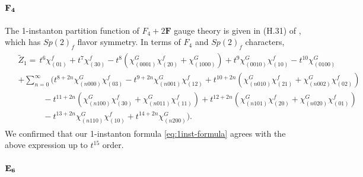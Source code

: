 \documentclass[letterpaper, 11pt]{article}
\begin{document}
{\paragraph{$\bf F_4$}
The 1-instanton partition function of $F_4 + 2 \mathbf{F}$ gauge theory is given in (H.31) of \cite{DelZotto:2018tcj}, which has $Sp(2)_f$ flavor symmetry. In terms of $F_4$ and $Sp(2)_f$ characters, 
\begin{align}
    \label{eq:F4F2}
\begin{split}
  & \tilde{Z}_1 =\,t^6\chi^f_{(01)}+t^7\chi^{f}_{(30)}-t^8\left(\chi^G_{(0001)}\chi^f_{(20)}+\chi^G_{(1000)}\right)+t^9\chi^G_{(0010)}\chi^f_{(10)}-t^{10}\chi^G_{(0100)}\\
  &+\sum_{n=0}^{\infty}\Bigg(t^{8+2n}\chi^G_{(n000)}\chi^f_{(03)}-t^{9+2n}\chi^G_{(n001)}\chi^f_{(12)}+t^{10+2n}\left(\chi^G_{(n010)}\chi^f_{(21)}+\chi^G_{(n002)}\chi^f_{(02)}\right)\\
  &\qquad\quad-t^{11+2n}\left(\chi^G_{(n100)}\chi^f_{(30)}+\chi^G_{(n011)}\chi^f_{(11)}\right) 
  +t^{12+2n}\left(\chi^G_{(n101)}\chi^f_{(20)}+\chi^G_{(n020)}\chi^f_{(01)}\right)\\
  &\qquad\quad-t^{13+2n}\chi^G_{(n110)}\chi^f_{(10)}+t^{14+2n}\chi^G_{(n200)}\Bigg).
\end{split}
\end{align}
We confirmed that our 1-instanton formula \eqref{eq:1inst-formula} agrees with the above expression up to $t^{15}$ order. 


\paragraph{$\bf E_6$}

}
\end{document}
